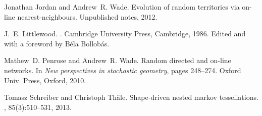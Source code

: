 \documentclass[12pt]{article}
\begin{document}
\begin{thebibliography}{10}
Jonathan Jordan and Andrew~R. Wade.
\newblock Evolution of random territories via on-line nearest-neighbours.
\newblock Unpublished notes, 2012.

J.~E. Littlewood.
.
\newblock Cambridge University Press, Cambridge, 1986.
\newblock Edited and with a foreword by B{\'e}la Bollob{\'a}s.

Mathew~D. Penrose and Andrew~R. Wade.
\newblock Random directed and on-line networks.
\newblock In {\em New perspectives in stochastic geometry}, pages 248--274.
  Oxford Univ. Press, Oxford, 2010.

Tomasz Schreiber and Christoph Th\"{a}le.
\newblock Shape-driven nested markov tessellations.
, 85(3):510--531, 2013.

\end{thebibliography}
 
\end{document}
